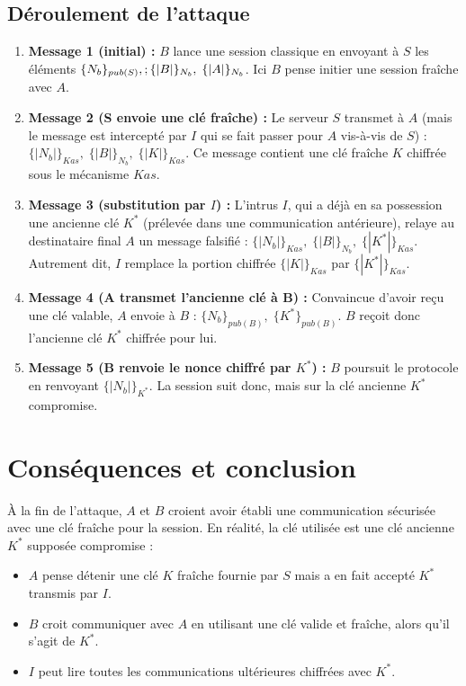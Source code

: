 \documentclass[11pt]{article}
\begin{document}
\subsection{Déroulement de l'attaque}

\begin{enumerate}
    \item \textbf{Message 1 (initial) :} $B$ lance une session classique en envoyant à $S$ les éléments $\{N_b\}_{pub(S)},\ \\;\{|B|\}_{N_b},\;\{|A|\}_{N_b}$. Ici $B$ pense initier une session fraîche avec $A$.

    \item \textbf{Message 2 (S envoie une clé fraîche) :} Le serveur $S$ transmet à $A$ (mais le message est intercepté par $I$ qui se fait passer pour $A$ vis-à-vis de $S$) : $\{|N_b|\}_{Kas},\;\{|B|\}_{N_b},\;\{|K|\}_{Kas}$. Ce message contient une clé fraîche $K$ chiffrée sous le mécanisme $Kas$.

    \item \textbf{Message 3 (substitution par $I$) :} L'intrus $I$, qui a déjà en sa possession une ancienne clé $K^*$ (prélevée dans une communication antérieure), relaye au destinataire final $A$ un message falsifié : $\{|N_b|\}_{Kas},\;\{|B|\}_{N_b},\;\{|K^*|\}_{Kas}$. Autrement dit, $I$ remplace la portion chiffrée $\{|K|\}_{Kas}$ par $\{|K^*|\}_{Kas}$.

    \item \textbf{Message 4 (A transmet l'ancienne clé à B) :} Convaincue d'avoir reçu une clé valable, $A$ envoie à $B$ : $\{N_b\}_{pub(B)},\;\{K^*\}_{pub(B)}$. $B$ reçoit donc l'ancienne clé $K^*$ chiffrée pour lui.

    \item \textbf{Message 5 (B renvoie le nonce chiffré par $K^*$) :} $B$ poursuit le protocole en renvoyant $\{|N_b|\}_{K^*}$. La session suit donc, mais sur la clé ancienne $K^*$ compromise.
\end{enumerate}


\section{Conséquences et conclusion}

\noindent
À la fin de l'attaque, $A$ et $B$ croient avoir établi une communication sécurisée avec une clé fraîche pour la session. En réalité, la clé utilisée est une clé ancienne $K^*$ supposée compromise :

\begin{itemize}
    \item $A$ pense détenir une clé $K$ fraîche fournie par $S$ mais a en fait accepté $K^*$ transmis par $I$.
    \item $B$ croit communiquer avec $A$ en utilisant une clé valide et fraîche, alors qu'il s'agit de $K^*$.
    \item $I$ peut lire toutes les communications ultérieures chiffrées avec $K^*$.
\end{itemize}
\end{document}
